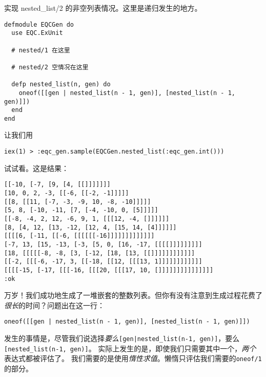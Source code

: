 \begin{code}{实现 nested\_list/2 的非空列表情况。这里是递归发生的地方。}
\begin{verbatim}
defmodule EQCGen do
  use EQC.ExUnit

  # nested/1 在这里

  # nested/2 空情况在这里

  defp nested_list(n, gen) do
    oneof([[gen | nested_list(n - 1, gen)], [nested_list(n - 1, gen)]])
  end
end
\end{verbatim}
\label{lst:implementing_the_non_empty_list_case_of_nested_2_here_is_where_the_recursion_happens}
\end{code}

让我们用
\begin{code}{}  \begin{verbatim}
iex(1) > :eqc_gen.sample(EQCGen.nested_list(:eqc_gen.int()))
\end{verbatim}
\end{code}
试试看。这是结果：

\begin{code}{}  \begin{verbatim}
[[-10, [-7, [9, [4, [[]]]]]]]
[10, 0, 2, -3, [[-6, [[-2, -1]]]]]
[[8, [[11, [-7, -3, -9, 10, -8, -10]]]]]
[5, 8, [-10, -11, [7, [-4, -10, 0, [5]]]]]
[[-8, -4, 2, 12, -6, 9, 1, [[[12, -4, []]]]]]
[8, [4, 12, [13, -12, [12, 4, [15, 14, [4]]]]]]
[[[[6, [-11, [[-6, [[[[[[-16]]]]]]]]]]]]]
[-7, 13, [15, -13, [-3, [5, 0, [16, -17, [[[[]]]]]]]]]
[18, [[[[[-8, -8, [3, [-12, [18, [13, [[]]]]]]]]]]]]
[[-2, [[[-6, -17, 3, [[-18, [[12, [[[13, 1]]]]]]]]]]]]
[[[[-15, [-17, [[[-16, [[[20, [[[17, 10, []]]]]]]]]]]]]]]
:ok
\end{verbatim}
  \end{code}
  
万岁！我们成功地生成了一堆嵌套的整数列表。但你有没有注意到生成过程花费了\emph{很长}的时间？问题出在这一行：

\begin{code}{}  \begin{verbatim}
oneof([[gen | nested_list(n - 1, gen)], [nested_list(n - 1, gen)]])
\end{verbatim}
\end{code}
  
发生的事情是，尽管我们说选择\emph{要么}\texttt{[gen|nested\_list(n-1, gen)]}，要么\texttt{[nested\_list(n-1, gen)]}。
实际上发生的是，即使我们只需要其中一个，\emph{两个}表达式都被评估了。
我们需要的是使用\emph{惰性求值}。懒惰只评估我们需要的\texttt{oneof/1}的部分。

